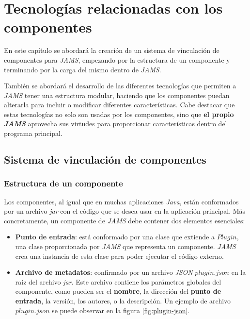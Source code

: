 \chapter{Tecnologías relacionadas con los componentes}\label{ch:tecnologias-relacionadas-con-los-componentes}

En este capítulo se abordará la creación de un sistema de
vinculación de componentes para \textit{JAMS}, empezando por
la estructura de un componente y terminando por la carga
del mismo dentro de \textit{JAMS}.

También se abordará el desarrollo de las
diferentes tecnologías que permiten a \textit{JAMS}
tener una estructura modular, haciendo que los
componentes puedan alterarla para incluir o modificar
diferentes características.
Cabe destacar que estas tecnologías no solo son usadas
por los componentes, sino que \textbf{el propio \textit{JAMS}}
aprovecha sus virtudes para proporcionar características
dentro del programa principal.

\section{Sistema de vinculación de componentes}\label{sec:sistema-de-vinculacion-de-componentes}

\subsection{Estructura de un componente}\label{subsec:estructura-de-un-componente}

Los componentes, al igual que en muchas aplicaciones \textit{Java},
están conformados por un archivo \textit{jar} con el código que
se desea usar en la aplicación principal.
Más concretamente, un componente de \textit{JAMS} debe contener
dos elementos esenciales:
\begin{itemize}
    \item \textbf{Punto de entrada}: está conformado por una
    clase que extiende a $Plugin$, una clase proporcionada por
    \textit{JAMS} que representa un componente.
    \textit{JAMS} crea una instancia de esta clase para
    poder ejecutar el código externo.
    \item \textbf{Archivo de metadatos}: confirmado por un archivo
    \textit{JSON}\cite{JSON} $plugin.json$ en la raíz del archivo \textit{jar}.
    Este archivo contiene los parámetros globales del componente,
    como pueden ser el \textbf{nombre}, la dirección del
    \textbf{punto de entrada}, la versión, los autores,
    o la descripción.
    Un ejemplo de archivo $plugin.json$ se puede observar en la
    figura \ref{fig:plugin-json}.
\end{itemize}


